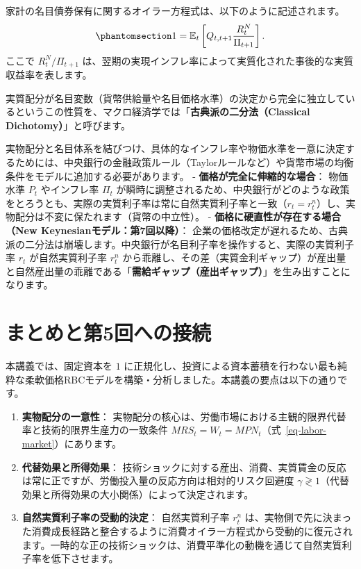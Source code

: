 \documentclass[
  japanese,
  lualatex,
  ja=standard,
  12pt,
  a4paper]{ltjsarticle}
\providecommand{\tightlist}{%
  \setlength{\itemsep}{0pt}\setlength{\parskip}{0pt}}
\begin{document}
家計の名目債券保有に関するオイラー方程式は、以下のように記述されます。
\begin{equation}\protect\phantomsection\label{eq-nominal-bond-euler}{
1 = \mathbb{E}_t \left[ Q_{t,t+1} \frac{R_t^N}{\Pi_{t+1}} \right].
}\end{equation} ここで \(R_t^N / \Pi_{t+1}\)
は、翌期の実現インフレ率によって実質化された事後的な実質収益率を表します。

実質配分が名目変数（貨幣供給量や名目価格水準）の決定から完全に独立しているというこの性質を、マクロ経済学では「\textbf{古典派の二分法（Classical
Dichotomy）}」と呼びます。

実物配分と名目体系を結びつけ、具体的なインフレ率や物価水準を一意に決定するためには、中央銀行の金融政策ルール（Taylorルールなど）や貨幣市場の均衡条件をモデルに追加する必要があります。
- \textbf{価格が完全に伸縮的な場合}： 物価水準 \(P_t\) やインフレ率
\(\Pi_t\)
が瞬時に調整されるため、中央銀行がどのような政策をとろうとも、実際の実質利子率は常に自然実質利子率と一致（\(r_t = r_t^n\)）し、実物配分は不変に保たれます（貨幣の中立性）。
- \textbf{価格に硬直性が存在する場合（New
Keynesianモデル：第7回以降）}：
企業の価格改定が遅れるため、古典派の二分法は崩壊します。中央銀行が名目利子率を操作すると、実際の実質利子率
\(r_t\) が自然実質利子率 \(r_t^n\)
から乖離し、その差（実質金利ギャップ）が産出量と自然産出量の乖離である「\textbf{需給ギャップ（産出ギャップ）}」を生み出すことになります。

\section{まとめと第5回への接続}\label{ux307eux3068ux3081ux3068ux7b2c5ux56deux3078ux306eux63a5ux7d9a}

本講義では、固定資本を \(1\)
に正規化し、投資による資本蓄積を行わない最も純粋な柔軟価格RBCモデルを構築・分析しました。本講義の要点は以下の通りです。

\begin{enumerate}
\def\labelenumi{\arabic{enumi}.}
\tightlist
\item
  \textbf{実物配分の一意性}：
  実物配分の核心は、労働市場における主観的限界代替率と技術的限界生産力の一致条件
  \(MRS_t = W_t = MPN_t\)（式~\ref{eq-labor-market}）にあります。
\item
  \textbf{代替効果と所得効果}：
  技術ショックに対する産出、消費、実質賃金の反応は常に正ですが、労働投入量の反応方向は相対的リスク回避度
  \(\gamma \gtrless 1\)（代替効果と所得効果の大小関係）によって決定されます。
\item
  \textbf{自然実質利子率の受動的決定}： 自然実質利子率 \(r_t^n\)
  は、実物側で先に決まった消費成長経路と整合するように消費オイラー方程式から受動的に復元されます。一時的な正の技術ショックは、消費平準化の動機を通じて自然実質利子率を低下させます。
\end{enumerate}
\end{document}
